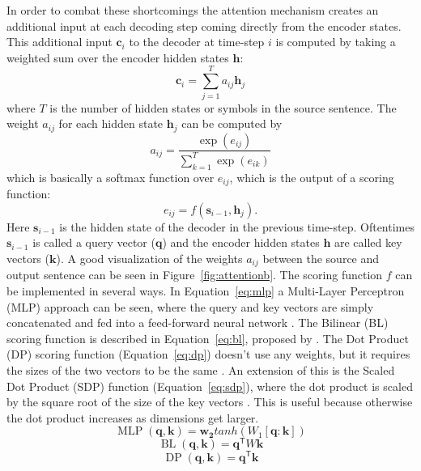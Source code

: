 \documentclass[12pt]{article}
\DeclareMathOperator{\MLP}{MLP}
\DeclareMathOperator{\DP}{DP}
\DeclareMathOperator{\BL}{BL}
\begin{document}
In order to combat these shortcomings the attention mechanism creates an additional input at each decoding step coming directly from the encoder states. This additional input \(\bm{c}_i\) to the decoder at time-step \(i\) is computed by taking a weighted sum over the encoder hidden states \(\bm{h}\):
\begin{equation} \label{eqattention}
\bm{c}_i=\sum_{j=1}^{T}a_{ij}\bm{h}_j
\end{equation}
where \(T\) is the number of hidden states or symbols in the source sentence. The weight \(a_{ij}\) for each hidden state \(\bm{h}_j\) can be computed by
\begin{equation}
a_{ij}=\frac{\exp(e_{ij})}{\sum_{k=1}^{T}\exp(e_{ik})}
\end{equation}
which is basically a softmax function over \(e_{ij}\), which is the output of a scoring function:
\begin{equation}
e_{ij}=f(\bm{s}_{i-1},\bm{h}_j).
\end{equation}
Here \(\bm{s}_{i-1}\) is the hidden state of the decoder in the previous time-step. Oftentimes \(\bm{s}_{i-1}\) is called a query vector (\(\bm{q}\)) and the encoder hidden states \(\bm{h}\) are called key vectors (\(\bm{k}\)). A good visualization of the weights \(a_{ij}\) between the source and output sentence can be seen in Figure~\ref{fig:attentionb}. The scoring function \(f\) can be implemented in several ways. In Equation~\ref{eq:mlp} a Multi-Layer Perceptron (MLP) approach can be seen, where the query and key vectors are simply concatenated and fed into a feed-forward neural network \cite{Bahdanau:2014}. The Bilinear (BL) scoring function is described in Equation~\ref{eq:bl}, proposed by \cite{Luong:2015}. The Dot Product (DP) scoring function (Equation~\ref{eq:dp}) doesn't use any weights, but it requires the sizes of the two vectors to be the same \cite{Luong:2015}. An extension of this is the Scaled Dot Product (SDP) function (Equation~\ref{eq:sdp}), where the dot product is scaled by the square root of the size of the key vectors \cite{Vaswani:2017}. This is useful because otherwise the dot product increases as dimensions get larger.
\begin{equation} \label{eq:mlp}
\MLP(\bm{q},\bm{k})=\bm{w_2}tanh(W_1[\bm{q}:\bm{k}])
\end{equation}
\begin{equation} \label{eq:bl}
\BL(\bm{q},\bm{k})=\bm{q}^\mathsf{T}W\bm{k}
\end{equation}
\begin{equation} \label{eq:dp}
\DP(\bm{q},\bm{k})=\bm{q}^\mathsf{T}\bm{k}
\end{equation}
\end{document}
